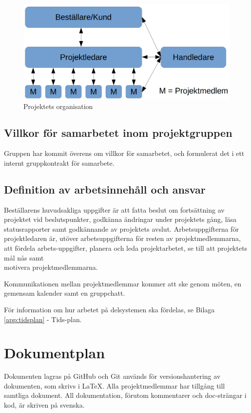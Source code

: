 \documentclass[a4paper,titlepage,12pt]{article}
\begin{document}
	\begin{figure}[h!]
		\begin{center}
		\includegraphics[width=0.8\linewidth]{images/projectroles.png}
		\caption{Projektets organisation \label{fig:organization}}
		\end{center}
	\end{figure}
	 
	\subsection{Villkor för samarbetet inom projektgruppen}
    Gruppen har kommit överens om villkor för samarbetet, och formulerat det i
    ett internt gruppkontrakt för samarbete.
	
	\subsection{Definition av arbetsinnehåll och ansvar}
	Beställarens huvudsakliga uppgifter är att fatta beslut
	om fortsättning av projektet vid beslutspunkter, godkänna
	ändringar under projektets gång, läsa statusrapporter samt godkännande av
	projektets avslut. Arbetsuppgifterna för projektledaren är, utöver
	arbetsuppgifterna för resten av projektmedlemmarna, att fördela
	arbets-uppgifter, planera och leda projektarbetet, se till att projektets mål
	nås samt \\ motivera projektmedlemmarna.

	Kommunikationen mellan projektmedlemmar kommer att ske genom möten, en
	gemensam kalender samt en gruppchatt.
	
	För information om hur arbetet på delsystemen ska fördelas, se Bilaga
	\ref{app:tidsplan} - Tids-plan.
	
	\section{Dokumentplan}
	Dokumenten lagras på GitHub och Git används för versionshantering av
	dokumenten, som skrivs i LaTeX. Alla projektmedlemmar har tillgång till
	samtliga dokument. All dokumentation, förutom kommentarer och doc-strängar
	i kod, är skriven på svenska.
\end{document}
